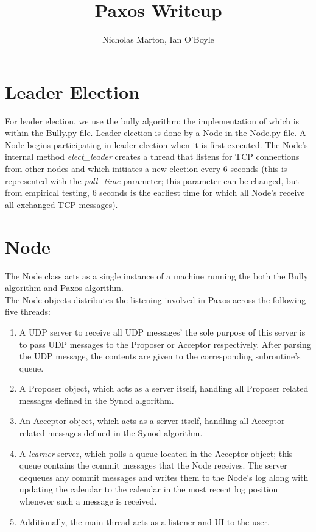 \documentclass{article}
\begin{document}
	
	\title{Paxos Writeup}
	\author{Nicholas Marton, Ian O'Boyle}
	
	\maketitle
	
	\section{Leader Election}
		For leader election, we use the bully algorithm; the implementation of which is within the Bully.py file.
		Leader election is done by a Node in the Node.py file. A Node begins participating in leader election when it is first executed. The Node's internal method \textit{elect\_leader} creates a thread that listens for TCP connections from other nodes and which initiates a new election every 6 seconds (this is represented with the \textit{poll\_time} parameter; this parameter can be changed, but from empirical testing, 6 seconds is the earliest time for which all Node's receive all exchanged TCP messages).

	\section{Node}
		The Node class acts as a single instance of a machine running the both the Bully algorithm and Paxos algorithm. \\
		
		\noindent The Node objects distributes the listening involved in Paxos across the following five threads:
		\begin{enumerate}
			\item A UDP server to receive all UDP messages' the sole purpose of this server is to pass UDP messages to the Proposer or Acceptor respectively. After parsing the UDP message, the contents are given to the corresponding subroutine's queue.
			\item A Proposer object, which acts as a server itself, handling all Proposer related messages defined in the Synod algorithm.
			\item An Acceptor object, which acts as a server itself, handling all Acceptor related messages defined in the Synod algorithm.
			\item A \textit{learner} server, which polls a queue located in the Acceptor object; this queue contains the commit messages that the Node receives. The server dequeues any commit messages and writes them to the Node's log along with updating the calendar to the calendar in the most recent log position whenever such a message is received.
			\item Additionally, the main thread acts as a listener and UI to the user.
		\end{enumerate}
		
\end{document}
